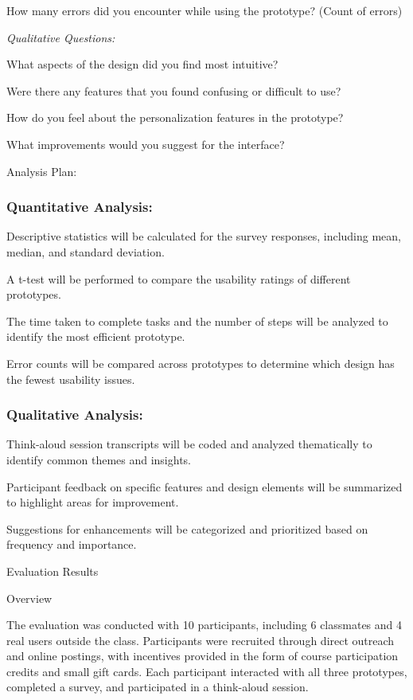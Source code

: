 \documentclass[
	letterpaper, %
]{jdf}
\begin{document}
How many errors did you encounter while using the prototype? (Count of errors)

\textit{Qualitative Questions:}

What aspects of the design did you find most intuitive?

Were there any features that you found confusing or difficult to use?

How do you feel about the personalization features in the prototype?

What improvements would you suggest for the interface?

Analysis Plan:

 

\subsubsection{Quantitative Analysis:}

Descriptive statistics will be calculated for the survey responses, including mean, median, and standard deviation.

A t-test will be performed to compare the usability ratings of different prototypes.

The time taken to complete tasks and the number of steps will be analyzed to identify the most efficient prototype.

Error counts will be compared across prototypes to determine which design has the fewest usability issues.

\subsubsection{Qualitative Analysis:}

Think-aloud session transcripts will be coded and analyzed thematically to identify common themes and insights.

Participant feedback on specific features and design elements will be summarized to highlight areas for improvement.

Suggestions for enhancements will be categorized and prioritized based on frequency and importance.

Evaluation Results

Overview

The evaluation was conducted with 10 participants, including 6 classmates and 4 real users outside the class. Participants were recruited through direct outreach and online postings, with incentives provided in the form of course participation credits and small gift cards. Each participant interacted with all three prototypes, completed a survey, and participated in a think-aloud session.
\end{document}
